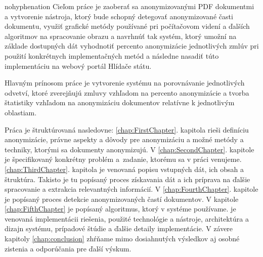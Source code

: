 \begin{hyphenrules}{nohyphenation}
Cieľom práce je zaoberať sa anonymizovanými PDF dokumentmi a vytvorenie nástroja, 
ktorý bude schopný detegovať anonymizované časti dokumentu, využiť grafické metódy používané pri počítačovom videní a ďalších algoritmov na spracovanie obrazu a navrhnúť tak systém, ktorý umožní na základe dostupných dát vyhodnotiť percento anonymizácie jednotlivých zmlúv pri použití konkrétnych implementačných metód a následne nasadiť túto implementáciu na webový portál Hlídače státu.
\newline

Hlavným prínosom práce je vytvorenie systému na porovnávanie jednotlivých odvetví, ktoré zverejňujú zmluvy vzhľadom na percento anonymizácie a
tvorba štatistiky vzhľadom na anonymizáciu dokumentov relatívne k jednotlivým oblastiam.
\newline

Práca je štruktúrovaná nasledovne: \ref{chap:FirstChapter}. kapitola rieši definíciu anonymizácie, právne aspekty a dôvody pre anonymizáciu a možné metódy a techniky, ktorými sa dokumenty anonymizujú. V \ref{chap:SecondChapter}. kapitole je špecifikovaný konkrétny problém a~zadanie, ktorému sa v práci venujeme. \ref{chap:ThirdChapter}. kapitola je venovaná popisu vstupných dát, ich obsah a štruktúra. Takisto je tu popísaný proces získavania dát a ich príprava na ďalšie spracovanie a extrakcia relevantných informácií. V \ref{chap:FourthChapter}. kapitole je popísaný proces detekcie anonymizovaných častí dokumentov. V kapitole \ref{chap:FifthChapter} je popísaný algoritmus, ktorý v systéme používame.
 je venovaná implementácii riešenia, použité technológie a nástroje, architektúra a dizajn systému, prípadové štúdie a ďalšie detaily implementácie. V závere kapitoly \ref{chap:conclusion} zhŕňame mimo dosiahnutých výsledkov aj osobné zistenia a odporúčania pre ďalší výskum.  
\end{hyphenrules}